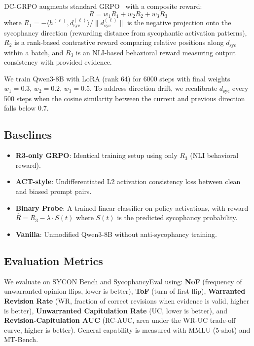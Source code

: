 \documentclass[11pt,a4paper]{article}
\begin{document}
DC-GRPO augments standard GRPO~\citep{grpo2024} with a composite reward:
\begin{equation}
    R = w_1 R_1 + w_2 R_2 + w_3 R_3
\end{equation}
where $R_1 = -\langle h^{(\ell)}, d_{\mathrm{syc}}^{(\ell)}\rangle / \|d_{\mathrm{syc}}^{(\ell)}\|$ is the negative projection onto the sycophancy direction (rewarding distance from sycophantic activation patterns), $R_2$ is a rank-based contrastive reward comparing relative positions along $d_{\mathrm{syc}}$ within a batch, and $R_3$ is an NLI-based behavioral reward measuring output consistency with provided evidence.

We train Qwen3-8B with LoRA (rank 64) for 6000 steps with final weights $w_1 = 0.3$, $w_2 = 0.2$, $w_3 = 0.5$. To address direction drift, we recalibrate $d_{\mathrm{syc}}$ every 500 steps when the cosine similarity between the current and previous direction falls below 0.7.

\subsection{Baselines}

\begin{itemize}
    \item \textbf{R3-only GRPO}: Identical training setup using only $R_3$ (NLI behavioral reward).
    \item \textbf{ACT-style}: Undifferentiated L2 activation consistency loss between clean and biased prompt pairs.
    \item \textbf{Binary Probe}: A trained linear classifier on policy activations, with reward $\hat{R} = R_3 - \lambda \cdot S(t)$ where $S(t)$ is the predicted sycophancy probability.
    \item \textbf{Vanilla}: Unmodified Qwen3-8B without anti-sycophancy training.
\end{itemize}

\subsection{Evaluation Metrics}

We evaluate on SYCON Bench and SycophancyEval using: \textbf{NoF} (frequency of unwarranted opinion flips, lower is better), \textbf{ToF} (turn of first flip), \textbf{Warranted Revision Rate} (WR, fraction of correct revisions when evidence is valid, higher is better), \textbf{Unwarranted Capitulation Rate} (UC, lower is better), and \textbf{Revision-Capitulation AUC} (RC-AUC, area under the WR-UC trade-off curve, higher is better). General capability is measured with MMLU (5-shot) and MT-Bench.
\end{document}
